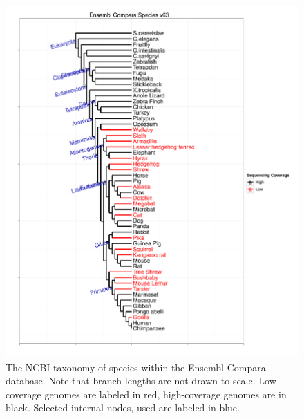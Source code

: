 \begin{figure}
\centering
\includegraphics[scale=0.4]{Figs/compara_63_tree.pdf}
\caption{The NCBI taxonomy of species within the Ensembl Compara
  database. Note that branch lengths are not drawn to
  scale. Low-coverage genomes are labeled in red, high-coverage
  genomes are in black. Selected internal nodes, used are labeled in
  blue.}
\label{ncbi_tree}
\end{figure}


